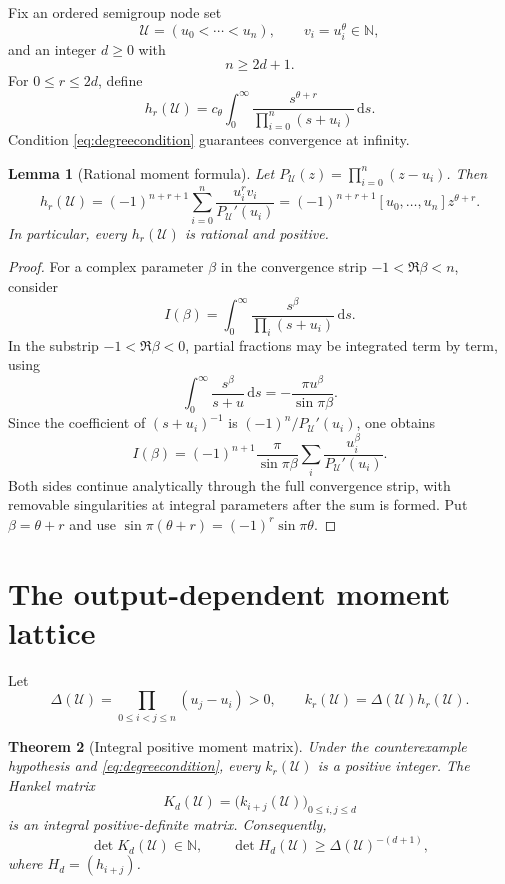 \documentclass[11pt]{article}
\newtheorem{theorem}{Theorem}[section]
\newtheorem{lemma}[theorem]{Lemma}
\theoremstyle{definition}
\theoremstyle{remark}
\newcommand{\N}{\mathbb N}
\newcommand{\dd}{\,\mathrm d}
\newcommand{\cst}{c_{\theta}}
\newcommand{\UU}{\mathcal U}
\begin{document}
Fix an ordered semigroup node set
\[
 \UU=(u_0<\cdots<u_n),\qquad v_i=u_i^\theta\in\N,
\]
and an integer $d\ge0$ with
\begin{equation}\label{eq:degreecondition}
 n\ge2d+1.
\end{equation}
For $0\le r\le2d$, define
\begin{equation}\label{eq:hr}
 h_r(\UU)=\cst\int_0^\infty
 \frac{s^{\theta+r}}{\prod_{i=0}^n(s+u_i)}\dd s.
\end{equation}
Condition \eqref{eq:degreecondition} guarantees convergence at infinity.

\begin{lemma}[Rational moment formula]\label{lem:rationalmoment}
Let $P_\UU(z)=\prod_{i=0}^n(z-u_i)$.  Then
\begin{equation}\label{eq:momentformula}
 h_r(\UU)=(-1)^{n+r+1}
 \sum_{i=0}^n\frac{u_i^rv_i}{P_\UU'(u_i)}
 =(-1)^{n+r+1}[u_0,\ldots,u_n]z^{\theta+r}.
\end{equation}
In particular, every $h_r(\UU)$ is rational and positive.
\end{lemma}

\begin{proof}
For a complex parameter $\beta$ in the convergence strip $-1<\Re\beta<n$, consider
\[
 I(\beta)=\int_0^\infty\frac{s^\beta}{\prod_i(s+u_i)}\dd s.
\]
In the substrip $-1<\Re\beta<0$, partial fractions may be integrated term by term, using
\[
 \int_0^\infty\frac{s^\beta}{s+u}\dd s=-\frac{\pi u^\beta}{\sin\pi\beta}.
\]
Since the coefficient of $(s+u_i)^{-1}$ is $(-1)^n/P_\UU'(u_i)$, one obtains
\[
 I(\beta)=(-1)^{n+1}\frac{\pi}{\sin\pi\beta}
 \sum_i\frac{u_i^\beta}{P_\UU'(u_i)}.
\]
Both sides continue analytically through the full convergence strip, with removable
singularities at integral parameters after the sum is formed.  Put $\beta=\theta+r$ and use
$\sin\pi(\theta+r)=(-1)^r\sin\pi\theta$.
\end{proof}

\section{The output-dependent moment lattice}

Let
\begin{equation}\label{eq:Delta}
 \Delta(\UU)=\prod_{0\le i<j\le n}(u_j-u_i)>0,
 \qquad k_r(\UU)=\Delta(\UU)h_r(\UU).
\end{equation}

\begin{theorem}[Integral positive moment matrix]\label{thm:momentlattice}
Under the counterexample hypothesis and \eqref{eq:degreecondition}, every $k_r(\UU)$ is a
positive integer.  The Hankel matrix
\begin{equation}\label{eq:Kmatrix}
 K_d(\UU)=\bigl(k_{i+j}(\UU)\bigr)_{0\le i,j\le d}
\end{equation}
is an integral positive-definite matrix.  Consequently,
\begin{equation}\label{eq:detlower}
 \det K_d(\UU)\in\N,
 \qquad
 \det H_d(\UU)\ge\Delta(\UU)^{-(d+1)},
\end{equation}
where $H_d=(h_{i+j})$.
\end{theorem}
\end{document}
